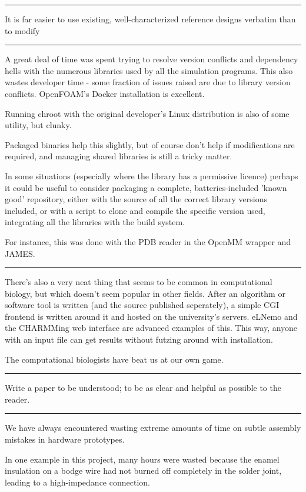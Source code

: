 \documentclass[fleqn,10pt]{article}
\begin{document}
\rule{\linewidth}{0.2pt}

It is far easier to use existing, well-characterized reference designs verbatim than to modify 

\rule{\linewidth}{0.2pt}

A great deal of time was spent trying to resolve version conflicts and dependency hells with the numerous libraries used by all the simulation programs. This also wastes developer time - some fraction of issues raised are due to library version conflicts. OpenFOAM's Docker installation is excellent.

Running chroot with the original developer's Linux distribution is also of some utility, but clunky. 

Packaged binaries help this slightly, but of course don't help if modifications are required, and managing shared libraries is still a tricky matter.

In some situations (especially where the library has a permissive licence) perhaps it could be useful to consider packaging a complete, batteries-included 'known good' repository, either with the source of all the correct library versions included, or with a script to clone and compile the specific version used, integrating all the libraries with the build system. 

For instance, this was done with the PDB reader in the OpenMM wrapper and JAMES.

\rule{\linewidth}{0.2pt}

There's also a very neat thing that seems to be common in computational biology, but which doesn't seem popular in other fields. After an algorithm or software tool is written (and the source published seperately), a simple CGI frontend is written around it and hosted on the university's servers. eLNemo and the CHARMMing web interface are advanced examples of this. This way, anyone with an input file can get results without futzing around with installation. 

The computational biologists have beat us at our own game.

\rule{\linewidth}{0.2pt}


Write a paper to be understood; to be as clear and helpful as possible to the reader.

\rule{\linewidth}{0.2pt}

We have always encountered wasting extreme amounts of time on subtle assembly mistakes in hardware prototypes. 

In one example in this project, many hours were wasted because the enamel insulation on a bodge wire had not burned off completely in the solder joint, leading to a high-impedance connection.
\end{document}
